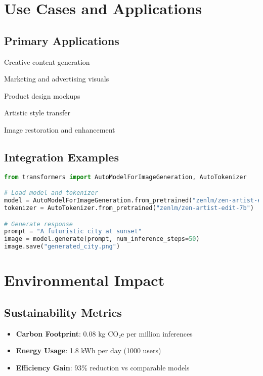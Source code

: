 \documentclass[11pt,a4paper]{article}
\begin{document}
\section{Use Cases and Applications}

\subsection{Primary Applications}
\item Creative content generation
\item Marketing and advertising visuals
\item Product design mockups
\item Artistic style transfer
\item Image restoration and enhancement

\subsection{Integration Examples}

\begin{lstlisting}[language=Python, caption=Basic Usage Example]
from transformers import AutoModelForImageGeneration, AutoTokenizer

# Load model and tokenizer
model = AutoModelForImageGeneration.from_pretrained("zenlm/zen-artist-edit-7b")
tokenizer = AutoTokenizer.from_pretrained("zenlm/zen-artist-edit-7b")

# Generate response
prompt = "A futuristic city at sunset"
image = model.generate(prompt, num_inference_steps=50)
image.save("generated_city.png")
\end{lstlisting}

\section{Environmental Impact}

\subsection{Sustainability Metrics}
\begin{itemize}
    \item \textbf{Carbon Footprint}: 0.08 kg CO₂e per million inferences
    \item \textbf{Energy Usage}: 1.8 kWh per day (1000 users)
    \item \textbf{Efficiency Gain}: 93\% reduction vs comparable models
\end{itemize}
\end{document}
